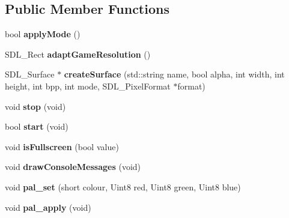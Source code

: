 \subsection*{Public Member Functions}
\begin{DoxyCompactItemize}
\item 
\hypertarget{class_c_video_driver_af2cc37904b48c749e9bb1506ff056fc8}{
bool {\bfseries applyMode} ()}
\label{class_c_video_driver_af2cc37904b48c749e9bb1506ff056fc8}

\item 
\hypertarget{class_c_video_driver_af144c1c539b6e667a3294385676b2ce3}{
SDL\_\-Rect {\bfseries adaptGameResolution} ()}
\label{class_c_video_driver_af144c1c539b6e667a3294385676b2ce3}

\item 
\hypertarget{class_c_video_driver_ab32c370b1701e568277e504487143694}{
SDL\_\-Surface $\ast$ {\bfseries createSurface} (std::string name, bool alpha, int width, int height, int bpp, int mode, SDL\_\-PixelFormat $\ast$format)}
\label{class_c_video_driver_ab32c370b1701e568277e504487143694}

\item 
\hypertarget{class_c_video_driver_a8bd1c89b80562024ab35a1797e0f6572}{
void {\bfseries stop} (void)}
\label{class_c_video_driver_a8bd1c89b80562024ab35a1797e0f6572}

\item 
\hypertarget{class_c_video_driver_ac562ae698f197fec6aac4aa3002ca4bf}{
bool {\bfseries start} (void)}
\label{class_c_video_driver_ac562ae698f197fec6aac4aa3002ca4bf}

\item 
\hypertarget{class_c_video_driver_ae46630dc78182bcc8a2a86a563bbfb6b}{
void {\bfseries isFullscreen} (bool value)}
\label{class_c_video_driver_ae46630dc78182bcc8a2a86a563bbfb6b}

\item 
\hypertarget{class_c_video_driver_af71c275500840a0914de0722df010423}{
void {\bfseries drawConsoleMessages} (void)}
\label{class_c_video_driver_af71c275500840a0914de0722df010423}

\item 
\hypertarget{class_c_video_driver_a1d20b56e18196140d4839a97e4c561f5}{
void {\bfseries pal\_\-set} (short colour, Uint8 red, Uint8 green, Uint8 blue)}
\label{class_c_video_driver_a1d20b56e18196140d4839a97e4c561f5}

\item 
\hypertarget{class_c_video_driver_aca5e8f66b2268eee7f9afffb876fb361}{
void {\bfseries pal\_\-apply} (void)}
\label{class_c_video_driver_aca5e8f66b2268eee7f9afffb876fb361}


\end{DoxyCompactItemize}
